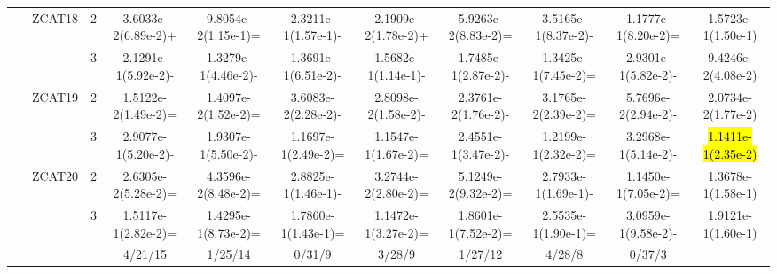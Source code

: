 \documentclass[a4paper,fleqn]{cas-dc}
\newcommand{\highlight}[1]{
	\begingroup
	\sethlcolor{Seashell}%
	\hl{#1}%
	\endgroup
}
\begin{document}
\begin{sloppypar}
\begin{table}[ht]
{\begin{tabular}{ccccccccccc}
					
					\multirow{12}{*}{~}&\multirow{2}{*}{ZCAT18}&2 &3.6033e-2(6.89e-2)+		&9.8054e-2(1.15e-1)=	&2.3211e-1(1.57e-1)-	&2.1909e-2(1.78e-2)+	&5.9263e-2(8.83e-2)=	&3.5165e-1(8.37e-2)-	&1.1777e-1(8.20e-2)= &1.5723e-1(1.50e-1)\\
					
					\multirow{12}{*}{~}&\multirow{2}{*}{~}&3&2.1291e-1(5.92e-2)-		&1.3279e-1(4.46e-2)-	&1.3691e-1(6.51e-2)-	&1.5682e-1(1.14e-1)-	&1.7485e-1(2.87e-2)-	&1.3425e-1(7.45e-2)=	&2.9301e-1(5.82e-2)-	&9.4246e-2(4.08e-2)\\
					
					\multirow{12}{*}{~}&\multirow{2}{*}{ZCAT19}&2 &1.5122e-2(1.49e-2)=	&1.4097e-2(1.52e-2)=	&3.6083e-2(2.28e-2)-	&2.8098e-2(1.58e-2)-	&2.3761e-2(1.76e-2)-	&3.1765e-2(2.39e-2)=	&5.7696e-2(2.94e-2)-	&2.0734e-2(1.77e-2)\\
					\multirow{12}{*}{~}&\multirow{2}{*}{~}&3&2.9077e-1(5.20e-2)-		&1.9307e-1(5.50e-2)-	&1.1697e-1(2.49e-2)=	&1.1547e-1(1.67e-2)=	&2.4551e-1(3.47e-2)-	&1.2199e-1(2.32e-2)=	&3.2968e-1(5.14e-2)-	&\highlight{1.1411e-1(2.35e-2)}\\
					
					
					
					\multirow{12}{*}{~}&\multirow{2}{*}{ZCAT20}&2 &2.6305e-2(5.28e-2)=		&4.3596e-2(8.48e-2)=	&2.8825e-1(1.46e-1)-	&3.2744e-2(2.80e-2)=	&5.1249e-2(9.32e-2)=	&2.7933e-1(1.69e-1)-	&1.1450e-1(7.05e-2)=	&1.3678e-1(1.58e-1)\\
					\multirow{12}{*}{~}&\multirow{2}{*}{~}&3 &1.5117e-1(2.82e-2)=		&1.4295e-1(8.73e-2)=	&1.7860e-1(1.43e-1)=	&1.1472e-1(3.27e-2)=	&1.8601e-1(7.52e-2)=	&2.5535e-1(1.90e-1)=	&3.0959e-1(9.58e-2)-	&1.9121e-1(1.60e-1)\\
					
					
					\hline
					$+/-/\approx$&~&~&4/21/15		&1/25/14	&0/31/9	&3/28/9	&1/27/12	&4/28/8	&0/37/3 &~ \\
					
					\hline
				\end{tabular}
			}
		\end{table}
		
		\begin{table}[ht]
			\centering
			\caption{ {IGD+ values obtained by TS-MOEA-EPF and  {6 of 13} MaOEAs on ZCAT,  where ``+'', ``-'', and ``='' respectively represent the comparison algorithms being superior, inferior, and equivalent to TS-MOEA-EPF (Part II) }}\label{table:The average IGDp on ZCAT_2}
\end{table}
\end{sloppypar}
\end{document}
